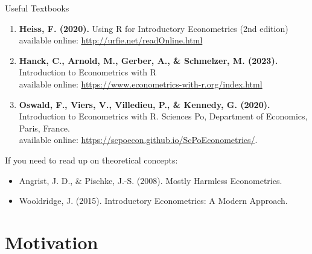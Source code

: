 \documentclass[9pt,aspectratio=169]{beamer}
\begin{document}
\begin{frame}{Useful Textbooks}
\linespread{1.3}\selectfont %
  \begin{enumerate}
    \item \textbf{Heiss, F. (2020).} Using R for Introductory Econometrics (2nd edition)\\
    available online: \href{http://urfie.net/readOnline.html}{http://urfie.net/readOnline.html}

    \item \textbf{Hanck, C., Arnold, M., Gerber, A., \& Schmelzer, M. (2023).} Introduction to Econometrics with R\\
    available online: \href{https://www.econometrics-with-r.org/index.html}{https://www.econometrics-with-r.org/index.html}

    \item \textbf{Oswald, F., Viers, V., Villedieu, P., \& Kennedy, G. (2020).}
    Introduction to Econometrics with R. Sciences Po, Department of Economics, Paris, France.\\
    available online: \href{https://scpoecon.github.io/ScPoEconometrics/}{https://scpoecon.github.io/ScPoEconometrics/}.
  \end{enumerate}

  \vspace{0.3cm}
  If you need to read up on theoretical concepts:
  \begin{itemize}
    \item Angrist, J. D., \& Pischke, J.-S. (2008). Mostly Harmless Econometrics. %
    \item Wooldridge, J. (2015). Introductory Econometrics: A Modern Approach. %
  \end{itemize}
\end{frame}

\section{Motivation}
\end{document}
